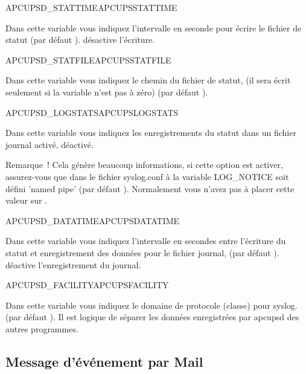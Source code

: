 \begin {description}

 {APCUPSD\_STATTIME}{APCUPSSTATTIME}

  Dans cette variable vous indiquez l'intervalle en seconde pour écrire
  le fichier de statut (par défaut ).  désactive l'écriture.


 {APCUPSD\_STATFILE}{APCUPSSTATFILE}

 Dans cette variable vous indiquez le chemin du fichier de statut, (il sera écrit
 seulement si la variable 
 n'est pas à zéro) (par défaut ).


 {APCUPSD\_LOGSTATS}{APCUPSLOGSTATS}

  Dans cette variable vous indiquez les enregistrements du statut dans un fichier
  journal  activé,  déactivé.

  Remarque~! Cela génère beaucoup informations, si cette option est activer,
  assurez-vous que dans le fichier syslog.conf à la variable LOG\_NOTICE soit
  défini 'named pipe' (par défaut ).
  Normalement vous n'avez pas à placer cette valeur sur .


 {APCUPSD\_DATATIME}{APCUPSDATATIME}

  Dans cette variable vous indiquez l'intervalle en secondes entre l'écriture du
  statut et enregistrement des données pour le fichier journal, (par défaut ).
   déactive l'enregistrement du journal.


 {APCUPSD\_FACILITY}{APCUPSFACILITY}

 Dans cette variable vous indiquez le domaine de protocole (classe) pour syslog.
 (par défaut ).
 Il est logique de séparer les données enregistrées par apcupsd des autres programmes.

\end {description}

\subsection{Message d'événement par Mail}

